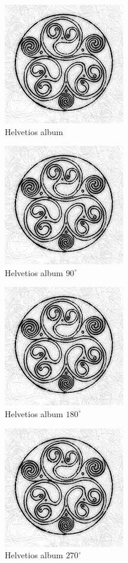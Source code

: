 \documentclass{article}
\begin{document}
\begin{figure}
\centering
\includegraphics[scale=0.5]{helvetios}
\caption{Helvetios album}
\end{figure}

\begin{figure}
\centering
\includegraphics[scale=0.5,angle=90]{helvetios}
\caption{Helvetios album $90^{\circ}$}
\end{figure}

\begin{figure}
	\centering
	\includegraphics[scale=0.5,angle=180]{helvetios}
	\caption[Helvetios album $180^{\circ}$ - label specific to the list of tables]{Helvetios album $180^{\circ}$}
\end{figure}

\begin{figure}
	\centering
	\includegraphics[scale=0.5,angle=270]{helvetios}
	\caption*{Helvetios album $270^{\circ}$}
\end{figure}

\clearpage

\listoffigures
\end{document}
